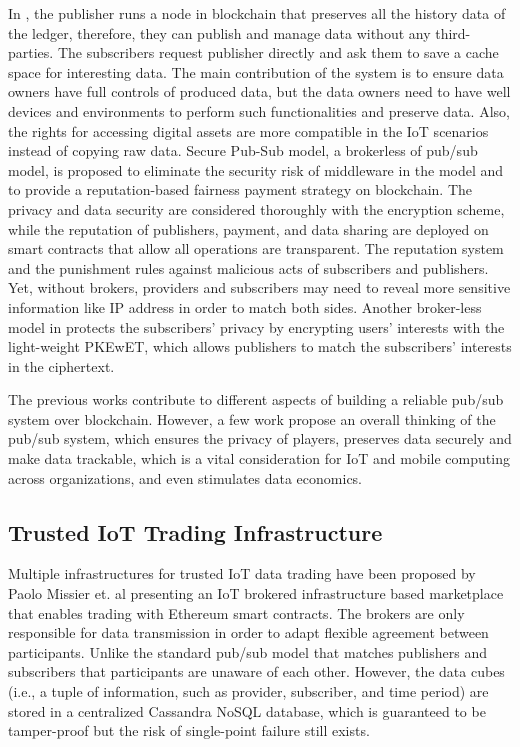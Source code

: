 \begin{spacing}{2.0}
In \cite{userCentricData}, the publisher runs a node in blockchain that preserves all the history data of the ledger, therefore, they can publish and manage data without any third-parties. The subscribers request publisher directly and ask them to save a cache space for interesting data. The main contribution of the system is to ensure data owners have full controls of produced data, but the data owners need to have well devices and environments to perform such functionalities and preserve data. Also, the rights for accessing digital assets are more compatible in the IoT scenarios instead of copying raw data. Secure Pub-Sub model\cite{SPS}, a brokerless of pub/sub model, is proposed to eliminate the security risk of middleware in the model and to provide a reputation-based fairness payment strategy on blockchain. The privacy and data security are considered thoroughly with the encryption scheme, while the reputation of publishers, payment, and data sharing are deployed on smart contracts that allow all operations are transparent. The reputation system and the punishment rules against malicious acts of subscribers and publishers. Yet, without brokers, providers and subscribers may need to reveal more sensitive information like IP address in order to match both sides. Another broker-less model in \cite{PrivacyPreservPubSub} protects the subscribers' privacy by encrypting users' interests with the light-weight PKEwET\cite{PKEwET}, which allows publishers to match the subscribers' interests in the ciphertext.

The previous works contribute to different aspects of building a reliable pub/sub system over blockchain. However, a few work propose an overall thinking of the pub/sub system, which ensures the privacy of players, preserves data securely and make data trackable, which is a vital consideration for IoT and mobile computing across organizations, and even stimulates data economics.

\subsection{Trusted IoT Trading Infrastructure}
Multiple infrastructures for trusted IoT data trading have been proposed by Paolo Missier et. al\cite{MindMyValue} presenting an IoT brokered infrastructure based marketplace that enables trading with Ethereum smart contracts. The brokers are only responsible for data transmission in order to adapt flexible agreement between participants. Unlike the standard pub/sub model that matches publishers and subscribers that participants are unaware of each other. However, the data cubes (i.e., a tuple of information, such as provider, subscriber, and time period) are stored in a centralized Cassandra NoSQL database, which is guaranteed to be tamper-proof but the risk of single-point failure still exists.


\end{spacing}
